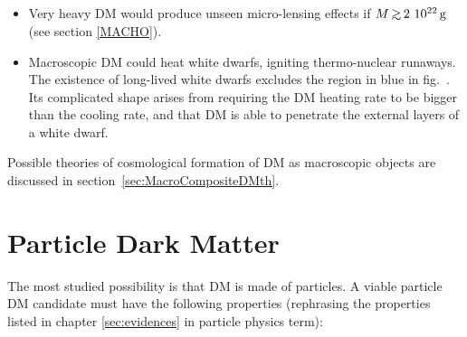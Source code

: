 \begin{itemize}
\item[$\circ$] Very heavy DM would produce unseen micro-lensing effects if $M\circa{>}2~10^{22}\gram$ (see section \ref{MACHO}).

\item[$\circ$] Macroscopic DM could heat white dwarfs, igniting thermo-nuclear runaways.
The existence of long-lived white dwarfs excludes the region in blue in fig.~\cite{MacroscopicDM}.
Its complicated shape arises from requiring the DM heating rate to be bigger than the cooling rate, 
 and that DM is able to penetrate the external layers of a white dwarf.

\end{itemize}


Possible theories of cosmological formation of
DM as macroscopic objects are discussed in section~\ref{sec:MacroCompositeDMth}.


\section{Particle Dark Matter}\label{sec:DMparticle}
The most studied possibility is that DM is made of particles. A viable particle DM candidate must have the following properties (rephrasing the properties listed in chapter \ref{sec:evidences} in particle physics term):

